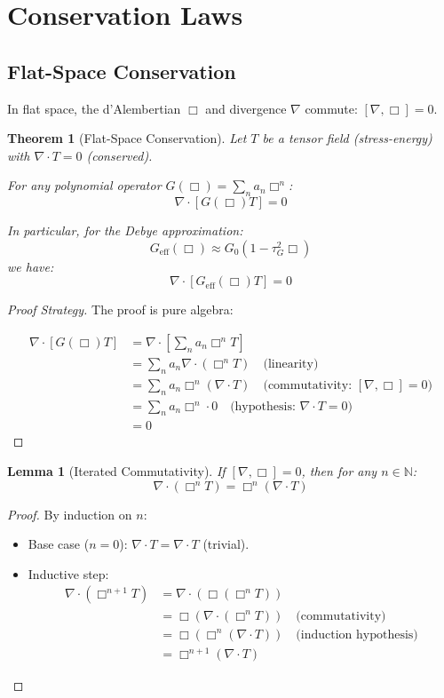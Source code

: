 \documentclass[11pt]{article}
\newtheorem{theorem}{Theorem}
\newtheorem{lemma}{Lemma}
\begin{document}
\section{Conservation Laws}

\subsection{Flat-Space Conservation}

In flat space, the d'Alembertian $\Box$ and divergence $\nabla$ commute: $[\nabla, \Box] = 0$.

\begin{theorem}[Flat-Space Conservation]
Let $T$ be a tensor field (stress-energy) with $\nabla \cdot T = 0$ (conserved).

For any polynomial operator $G(\Box) = \sum_n a_n \Box^n$:
\[
\nabla \cdot [G(\Box) T] = 0
\]

In particular, for the Debye approximation:
\[
G_{\text{eff}}(\Box) \approx G_0 (1 - \tau_G^2 \Box)
\]
we have:
\[
\nabla \cdot [G_{\text{eff}}(\Box) T] = 0
\]
\end{theorem}

\begin{proof}[Proof Strategy]
The proof is pure algebra:

\begin{align}
\nabla \cdot [G(\Box) T] &= \nabla \cdot \left[\sum_n a_n \Box^n T\right] \\
&= \sum_n a_n \nabla \cdot (\Box^n T) \quad \text{(linearity)} \\
&= \sum_n a_n \Box^n (\nabla \cdot T) \quad \text{(commutativity: } [\nabla, \Box] = 0) \\
&= \sum_n a_n \Box^n \cdot 0 \quad \text{(hypothesis: } \nabla \cdot T = 0) \\
&= 0
\end{align}
\end{proof}

\begin{lemma}[Iterated Commutativity]
If $[\nabla, \Box] = 0$, then for any $n \in \mathbb{N}$:
\[
\nabla \cdot (\Box^n T) = \Box^n (\nabla \cdot T)
\]
\end{lemma}

\begin{proof}
By induction on $n$:
\begin{itemize}
\item Base case ($n=0$): $\nabla \cdot T = \nabla \cdot T$ (trivial).
\item Inductive step: 
\begin{align}
\nabla \cdot (\Box^{n+1} T) &= \nabla \cdot (\Box(\Box^n T)) \\
&= \Box(\nabla \cdot (\Box^n T)) \quad \text{(commutativity)} \\
&= \Box(\Box^n (\nabla \cdot T)) \quad \text{(induction hypothesis)} \\
&= \Box^{n+1} (\nabla \cdot T)
\end{align}
\end{itemize}
\end{proof}
\end{document}
